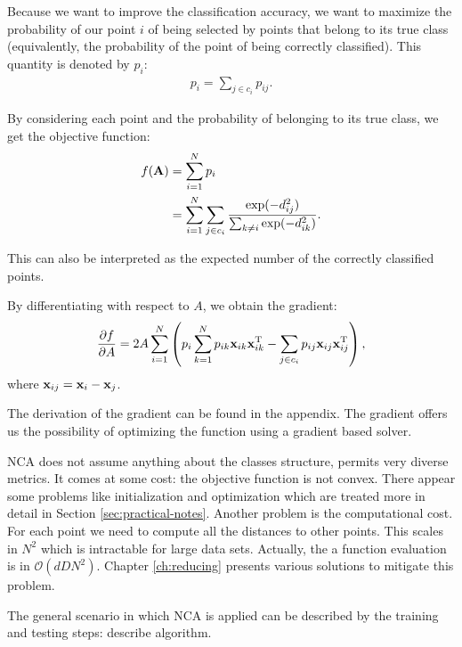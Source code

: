 	Because we want to improve the classification accuracy, we want to maximize the probability of our point $i$ of being selected by points that belong to its true class (equivalently, the probability of the point of being correctly classified). This quantity is denoted by $p_i$:
	\begin{align}
		p_i = \sum_{j\in c_i} p_{ij}.
	\end{align}
	
	By considering each point and the probability of belonging to its true class, we get the objective function:
	\begin{align}
		f(\mathbf{A}) &= \sum_{i=1}^N p_i\\
			   &= \sum_{i=1}^N \sum_{j\in c_i} \frac{
								\exp(-d_{ij}^2)
							  }{
								\sum_{k\neq i}\exp(-d_{ik}^2)
							  }.
	\end{align}
	
	This can also be interpreted as the expected number of the correctly classified points.
	
	By differentiating with respect to $A$, we obtain the gradient:
	\begin{align}
	  \frac{\partial f}{\partial
	A}=2A\sum_{i=1}^{N}\left(p_i\sum_{k=1}^Np_{ik}\mathbf{x}_{ik}\mathbf{x}_{ik}^{\textrm{T}} -
	\sum_{j\in c_i}p_{ij}\mathbf{x}_{ij}\mathbf{x}_{ij}^{\textrm{T}} \right)\label{eq:nca-grad},
	\end{align}
	where $\mathbf{x}_{ij} = \mathbf{x}_i - \mathbf{x}_j$.
	
	The derivation of the gradient can be found in the appendix. The gradient offers us the possibility of optimizing the function using a gradient based solver.
	
	NCA does not assume anything about the classes structure, permits very diverse metrics. It comes at some cost: the objective function is not convex. There appear some problems like initialization and optimization which are treated more in detail in Section \ref{sec:practical-notes}. Another problem is the computational cost. For each point we need to compute all the distances to other points. This scales in $N^2$ which is intractable for large data sets. Actually, the a function evaluation is in $\mathcal{O}(dDN^2)$. Chapter \ref{ch:reducing} presents various solutions to mitigate this problem.
	
	The general scenario in which NCA is applied can be described by the training and testing steps:
	describe algorithm.
	
